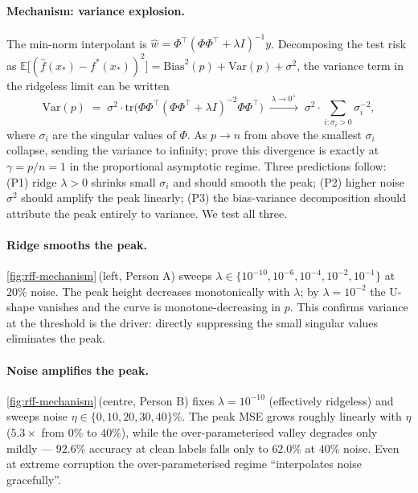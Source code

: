 \documentclass{article}
\begin{document}
\paragraph{Mechanism: variance explosion.} The min-norm interpolant is $\hat{w} = \Phi^\top(\Phi\Phi^\top + \lambda I)^{-1}y$. Decomposing the test risk as $\mathbb{E}\big[(\hat f(x_*) - f^*(x_*))^2\big] = \mathrm{Bias}^2(p) + \mathrm{Var}(p) + \sigma^2$, the variance term in the ridgeless limit can be written
\begin{equation}
  \label{eq:variance}
  \mathrm{Var}(p) \;=\; \sigma^2 \cdot \mathrm{tr}\big(\Phi\Phi^\top(\Phi\Phi^\top+\lambda I)^{-2}\Phi\Phi^\top\big) \;\xrightarrow{\,\lambda\to0^+\,}\; \sigma^2 \cdot \sum_{i:\sigma_i>0}\sigma_i^{-2},
\end{equation}
where $\sigma_i$ are the singular values of $\Phi$. As $p \to n$ from above the smallest $\sigma_i$ collapse, sending the variance to infinity; \citet{hastie2022surprises} prove this divergence is exactly at $\gamma = p/n = 1$ in the proportional asymptotic regime. Three predictions follow: (P1) ridge $\lambda > 0$ shrinks small $\sigma_i$ and should smooth the peak; (P2) higher noise $\sigma^2$ should amplify the peak linearly; (P3) the bias-variance decomposition should attribute the peak entirely to variance. We test all three.

\paragraph{Ridge smooths the peak.} \cref{fig:rff-mechanism}\,(left, Person A) sweeps $\lambda\in\{10^{-10}, 10^{-6}, 10^{-4}, 10^{-2}, 10^{-1}\}$ at $20\%$ noise. The peak height decreases monotonically with $\lambda$; by $\lambda=10^{-2}$ the U-shape vanishes and the curve is monotone-decreasing in $p$. This confirms variance at the threshold is the driver: directly suppressing the small singular values eliminates the peak.

\paragraph{Noise amplifies the peak.} \cref{fig:rff-mechanism}\,(centre, Person B) fixes $\lambda=10^{-10}$ (effectively ridgeless) and sweeps noise $\eta\in\{0,10,20,30,40\}\%$. The peak MSE grows roughly linearly with $\eta$ ($5.3\times$ from $0\%$ to $40\%$), while the over-parameterised valley degrades only mildly --- $92.6\%$ accuracy at clean labels falls only to $62.0\%$ at $40\%$ noise. Even at extreme corruption the over-parameterised regime ``interpolates noise gracefully''.
\end{document}
